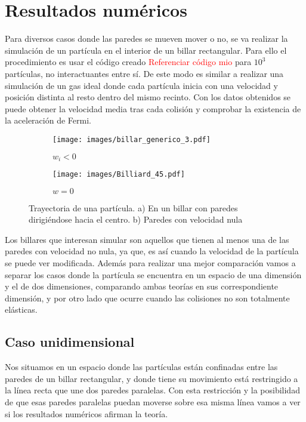 %
%

\chapter{Resultados numéricos}

Para diversos casos donde las paredes se mueven mover o no, se va realizar la simulación de un partícula en el interior de un billar rectangular. Para ello el procedimiento es usar el código creado \textcolor{red}{Referenciar código mio} para \( 10^3 \) partículas, no interactuantes entre sí. De este modo es similar a realizar una simulación de un gas ideal donde cada partícula inicia con una velocidad y posición distinta al resto dentro del mismo recinto. Con los datos obtenidos se puede obtener la velocidad media tras cada colisión y comprobar la existencia de la aceleración de Fermi.

\begin{figure}[H]
    \begin{subfigure}[b]{0.5\textwidth}
        \centering
        \texttt{[image: images/billar\_generico\_3.pdf]}
        \caption{$w_i<0$}
        \label{fig:a}
    \end{subfigure}
    \hfill
    \begin{subfigure}[b]{0.5\textwidth}
        \centering
        \texttt{[image: images/Billiard\_45.pdf]}
        \caption{$w=0$}
        \label{fig:s}
    \end{subfigure}
    \caption{Trayectoria de una partícula. a) En un billar con paredes dirigiéndose hacia el centro. b) Paredes con velocidad nula}
\end{figure}


Los billares que interesan simular son aquellos que tienen al menos una de las paredes con velocidad no nula, ya que, es así cuando la velocidad de la partícula se puede ver modificada. Además para realizar una mejor comparación vamos a separar los casos donde la partícula se encuentra en un espacio de una dimensión y el de dos dimensiones, comparando ambas teorías en sus correspondiente dimensión, y por otro lado que ocurre cuando las colisiones no son totalmente elásticas.

\section{Caso unidimensional}

Nos situamos en un espacio donde las partículas están confinadas entre las paredes de un billar rectangular, y donde tiene su movimiento está restringido a la línea recta que une dos paredes paralelas. Con esta restricción y la posibilidad de que esas paredes paralelas puedan moverse sobre esa misma línea vamos a ver si los resultados numéricos afirman la teoría.

